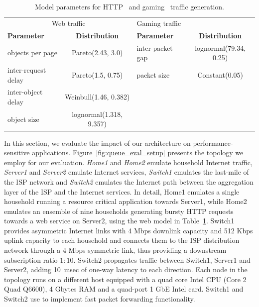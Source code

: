 \begin{table}
  \begin{tabular} {|l|c|l|c|}
    \hline
    \multicolumn{2}{c}{Web traffic} & Gaming traffic & \\
    \textbf{Parameter} & \textbf{Distribution} & \textbf{Parameter} & \textbf{Distribution} \\
    \hline
    objects per page    & Pareto(2.43, 3.0)       & inter-packet gap & lognormal(79.34, 0.25)\\
    inter-request delay & Pareto(1.5, 0.75)       & packet size      & Constant(0.05) \\
    inter-object delay  & Weinbull(1.46, 0.382)   & &                 \\
    object size         & lognormal(1.318, 9.357) & &   \\
    \hline
  \end{tabular} 
  \caption{\label{t:homework:performance-web-model}Model parameters for HTTP~ and
    gaming~ traffic generation.}
\end{table}


In this section, we evaluate the impact of our architecture on
performance-sensitive applications.  Figure~\ref{fig:queue_eval_setup} presents
the topology we employ for our evaluation.  \textit{Home1} and \textit{Home2}
emulate household Internet traffic,  \textit{Server1} and \textit{Server2}
emulate Internet services,  \textit{Switch1} emulates the last-mile of the ISP
network and \textit{Switch2} emulates the Internet path between the aggregation
layer of the ISP and the Internet services. In detail, Home1 emulates a single
household running a resource critical application towards Server1, while Home2
emulates an ensemble of nine households generating bursty HTTP requests towards a
web service on Server2, using the web model in
Table~\ref{t:homework:performance-web-model}.  Switch1 provides asymmetric
Internet links with 4 Mbps downlink capacity and  512 Kbps uplink capacity to
each household and  connects them to the ISP distribution network through a 4
Mbps symmetric link, thus providing a downstream subscription ratio $1:10$.
Switch2 propagates traffic between Switch1, Server1 and Server2, adding 10~msec
of one-way latency to each direction. Each node in the  topology runs on a
different host equipped with a quad core Intel CPU (Core 2 Quad Q6600), 4 Gbytes
RAM and a quad-port 1 GbE Intel card. Switch1 and Switch2 use \ovs to implement
fast packet forwarding functionality.


